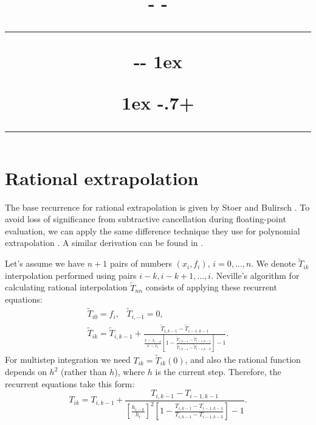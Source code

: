 \documentclass[11pt, twoside, twocolumn, paper = letter]{scrartcl}
\title{
    \parbox[t]{\linewidth}{%
        \centering%
        \kern-\baselineskip%
        \kern-\ht\strutbox%
        {\color{titlerulescolor}\rule{\linewidth}{1pt}}\par%
        \kern-\dimexpr\baselineskip-\ht\strutbox\relax%
        \kern1ex%
        \papertitle\par%
        \kern1ex%
        \kern-.7\dimexpr\ht\strutbox+\dp\strutbox\relax%
        {\color{titlerulescolor}\rule{\linewidth}{1pt}}%
    }%
}
\date{}
\begin{document}
\maketitle

\section{Rational extrapolation}

The base recurrence for rational extrapolation is given by Stoer and Bulirsch
\cite{BulirschStoer1964}. To avoid loss of significance from subtractive cancellation during
floating-point evaluation, we can apply the same difference technique they use for polynomial
extrapolation \cite{BulirschStoerBook}. A similar derivation can be found in \cite{NumRecipesInC}.

Let's assume we have $n + 1$ pairs of numbers $(x_i, f_i)$, $i = 0, \ldots, n$. We denote
$\tilde{T}_{ik}$ interpolation performed using pairs $i - k, i - k + 1, \ldots, i$. Neville's
algorithm for calculating rational interpolation $\tilde{T}_{nn}$ consists of applying these
recurrent equations:
\begin{equation*}
    \begin{gathered}
        \tilde{T}_{i0} = f_i
        \text{,}\quad
        \tilde{T}_{i,-1} = 0
        \text{,}\\
        \tilde{T}_{ik}
          = \tilde{T}_{i, k-1}
          + \frac{\tilde{T}_{i, k - 1} - \tilde{T}_{i - 1, k - 1}}
                 {
                     \frac{x - x_{i - k}}{x - x_i}
                     \left[
                         1- \frac{\tilde{T}_{i, k - 1} - \tilde{T}_{i - 1, k - 1}}
                                 {\tilde{T}_{i, k - 1} - \tilde{T}_{i - 1, k - 2}}
                     \right] - 1
                 }
        \text{.}
    \end{gathered}
\end{equation*}
For multistep integration we need $T_{ik} = \tilde{T}_{ik}(0)$, and also the rational function
depends on $h^2$ (rather than $h$), where $h$ is the current step. Therefore, the recurrent
equations take this form:
\begin{equation*}
    T_{ik}
      = T_{i, k-1}
      + \frac{T_{i, k - 1} - T_{i - 1, k - 1}}
             {
                 \left[\frac{h_{i - k}}{h_i}\right]^2
                 \left[
                     1- \frac{T_{i, k - 1} - T_{i - 1, k - 1}}
                             {T_{i, k - 1} - T_{i - 1, k - 2}}
                 \right] - 1
             }
    \text{.}
\end{equation*}
\end{document}
